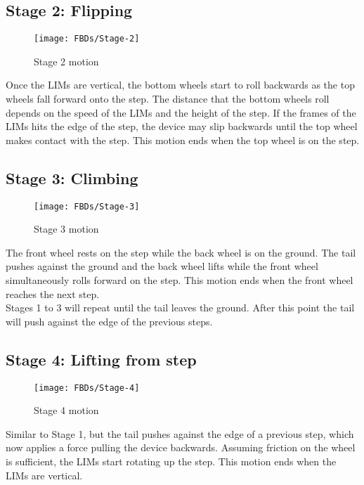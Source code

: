 \subsection*{Stage 2: Flipping}
\begin{wrapfigure}{r}{0.35\textwidth} %
	\centering
	\texttt{[image: FBDs/Stage-2]}
	\caption{Stage 2 motion}
	\label{fig:stage2}
\end{wrapfigure}
Once the LIMs are vertical, the bottom wheels start to roll backwards as the top wheels fall forward onto the step. The distance that the bottom wheels roll depends on the speed of the LIMs and the height of the step. If the frames of the LIMs hits the edge of the step, the device may slip backwards until the top wheel makes contact with the step. This motion ends when the top wheel is on the step.\\

\subsection*{Stage 3: Climbing}
\begin{wrapfigure}{r}{0.35\textwidth} %
	\centering
	\texttt{[image: FBDs/Stage-3]}
	\caption{Stage 3 motion}
	\label{fig:stage3}
\end{wrapfigure}
The front wheel rests on the step while the back wheel is on the ground. The tail pushes against the ground and the back wheel lifts while the front wheel simultaneously rolls forward on the step. This motion ends when the front wheel reaches the next step.\\

Stages 1 to 3 will repeat until the tail leaves the ground. After this point the tail will push against the edge of the previous steps. 

\subsection*{Stage 4: Lifting from step}
\begin{wrapfigure}{r}{0.35\textwidth} %
	\centering
	\texttt{[image: FBDs/Stage-4]}
	\caption{Stage 4 motion}
	\label{fig:stage4}
\end{wrapfigure}
Similar to Stage 1, but the tail pushes against the edge of a previous step, which now applies a force pulling the device backwards. Assuming friction on the wheel is sufficient, the LIMs start rotating up the step. This motion ends when the LIMs are vertical.

